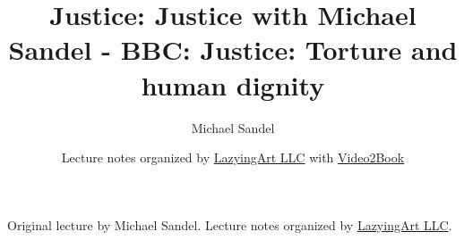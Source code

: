 \documentclass[11pt,oneside]{book}
\begin{document}
\frontmatter
\title{Justice: Justice with Michael Sandel - BBC: Justice: Torture and human dignity}
\author{Michael Sandel}
\date{Lecture notes organized by \href{https://lazying.art}{LazyingArt LLC} with \href{https://github.com/lachlanchen/Video2Book}{Video2Book}}
\maketitle
\begin{center}
\small Original lecture by Michael Sandel. Lecture notes organized by \href{https://lazying.art}{LazyingArt LLC}.
\end{center}
\clearpage
\mainmatter

\end{document}
